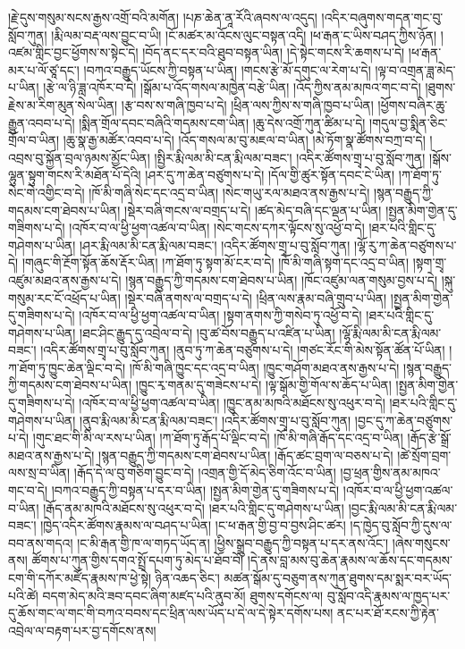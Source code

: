\documentclass{article}
\begin{document}
།རྗེ་དུས་གསུམ་སངས་རྒྱས་འགྲོ་བའི་མགོན། །པཎ་ཆེན་ནཱ་རོའི་ཞབས་ལ་འདུད། །འདིར་བཞུགས་གདན་གང་བུ་སློབ་ཀུན། །རྨི་ལམ་བརྡ་ལས་བྱུང་བ་ཡི། །ངོ་མཚར་མ་འོངས་ལུང་བསྟན་འདི། །ཕ་རྒན་ང་ཡིས་བཤད་ཀྱིས་ཉོན། །འཛམ་གླིང་བྱང་ཕྱོགས་ས་སྟེང་དེ། །བོད་ནང་དར་བའི་ཐུབ་བསྟན་ཡིན། །དེ་སྟེང་གངས་རི་ཆགས་པ་དེ། །ཕ་རྒན་མར་པ་ལོ་ཙཱ་དང་། །བཀའ་བརྒྱུད་ཡོངས་ཀྱི་བསྟན་པ་ཡིན། །གངས་རྩེ་མོ་དགུང་ལ་རེག་པ་དེ། །ལྟ་བ་འགྲན་ཟླ་མེད་པ་ཡིན། །རྩེ་ལ་ཉི་ཟླ་འཁོར་བ་དེ། །སྒོམ་པ་འོད་གསལ་མཁྱེན་བརྩེ་ཡིན། །འོད་ཀྱིས་ནམ་མཁའ་གང་བ་དེ། །ཐུགས་རྗེས་མ་རིག་མུན་སེལ་ཡིན། །རྩ་བས་ས་གཞི་ཁྱབ་པ་དེ། །ཕྲིན་ལས་ཀྱིས་ས་གཞི་ཁྱབ་པ་ཡིན། །ཕྱོགས་བཞིར་ཆུ་རྒྱུན་འབབ་པ་དེ། །སྨིན་གྲོལ་དབང་བཞིའི་གདམས་ངག་ཡིན། །ཆུ་དེས་འགྲོ་ཀུན་ཚིམ་པ་དེ། །གདུལ་བྱ་སྨིན་ཅིང་གྲོལ་བ་ཡིན། །ཆུ་སྣ་རྒྱ་མཚོར་འབབ་པ་དེ། །འོད་གསལ་མ་བུ་མཇལ་བ་ཡིན། །མེ་ཏོག་སྣ་ཚོགས་བཀྲ་བ་དེ། །འབྲས་བུ་སྐྱོན་བྲལ་ཉམས་མྱོང་ཡིན། །སྤྱིར་རྨི་ལམ་མི་ངན་རྨི་ལམ་བཟང་། །འདིར་ཚོགས་གྲྭ་པ་བུ་སློབ་ཀུན། །སྒོས་ལྷུན་སྟུག་གངས་རི་མཐོན་པོ་དེའི། །ཤར་དུ་ཀ་ཆེན་བཙུགས་པ་དེ། །དོལ་གྱི་ཚུར་སྟོན་དབང་ངེ་ཡིན། །ཀ་ཐོག་ཏུ་སེང་གེ་འགྱིང་བ་དེ། །ཁོ་མི་གཞི་སེང་དང་འདྲ་བ་ཡིན། །སེང་གཡུ་རལ་མཐའ་ནས་རྒྱས་པ་དེ། །སྙན་བརྒྱུད་ཀྱི་གདམས་ངག་ཐེབས་པ་ཡིན། །སྡེར་བཞི་གངས་ལ་བགྲད་པ་དེ། །ཚད་མེད་བཞི་དང་ལྡན་པ་ཡིན། །སྤྱན་མིག་གྱེན་དུ་གཟིགས་པ་དེ། །འཁོར་བ་ལ་ཕྱི་ཕྱག་འཚལ་བ་ཡིན། །སེང་གངས་དཀར་ལྟོངས་སུ་འཕྱོ་བ་དེ། །ཐར་པའི་གླིང་དུ་གཤེགས་པ་ཡིན། །ཤར་རྨི་ལམ་མི་ངན་རྨི་ལམ་བཟང་། །འདིར་ཚོགས་གྲྭ་པ་བུ་སློབ་ཀུན། །ལྷོ་རུ་ཀ་ཆེན་བཙུགས་པ་དེ། །གཞུང་གི་རྔོག་སྟོན་ཆོས་རྡོར་ཡིན། །ཀ་ཐོག་ཏུ་སྟག་མོ་ངར་བ་དེ། །ཁོ་མི་གཞི་སྟག་དང་འདྲ་བ་ཡིན། །སྟག་གྲྭ་འཛུམ་མཐའ་ནས་རྒྱས་པ་དེ། །སྙན་བརྒྱུད་ཀྱི་གདམས་ངག་ཐེབས་པ་ཡིན། །ཁོང་འཛུམ་ལན་གསུམ་བྱས་པ་དེ། །སྐུ་གསུམ་རང་ངོ་འཕྲོད་པ་ཡིན། །སྡེར་བཞི་ནགས་ལ་བགྲད་པ་དེ། །ཕྲིན་ལས་རྣམ་བཞི་གྲུབ་པ་ཡིན། །སྤྱན་མིག་གྱེན་དུ་གཟིགས་པ་དེ། །འཁོར་བ་ལ་ཕྱི་ཕྱག་འཚལ་བ་ཡིན། །སྟག་ནགས་ཀྱི་གསེབ་ཏུ་འཕྱོ་བ་དེ། །ཐར་པའི་གླིང་དུ་གཤེགས་པ་ཡིན། །ཐང་ཤིང་རྒྱུད་དུ་འབྲེལ་བ་དེ། །བུ་ཚ་བོས་བརྒྱུད་པ་འཛིན་པ་ཡིན། །ལྷོ་རྨི་ལམ་མི་ངན་རྨི་ལམ་བཟང་། །འདིར་ཚོགས་གྲྭ་པ་བུ་སློབ་ཀུན། །ནུབ་ཏུ་ཀ་ཆེན་བཙུགས་པ་དེ། །གཙང་རོང་གི་མེས་སྟོན་ཚོན་པོ་ཡིན། །ཀ་ཐོག་ཏུ་ཁྱུང་ཆེན་ལྡིང་བ་དེ། །ཁོ་མི་གཞི་ཁྱུང་དང་འདྲ་བ་ཡིན། །ཁྱུང་གཤོག་མཐའ་ནས་རྒྱས་པ་དེ། །སྙན་བརྒྱུད་ཀྱི་གདམས་ངག་ཐེབས་པ་ཡིན། །ཁྱུང་རྭ་གནམ་དུ་གཟེངས་པ་དེ། །ལྟ་སྒོམ་གྱི་གོལ་ས་ཆོད་པ་ཡིན། །སྤྱན་མིག་གྱེན་དུ་གཟིགས་པ་དེ། །འཁོར་བ་ལ་ཕྱི་ཕྱག་འཚལ་བ་ཡིན། །ཁྱུང་ནམ་མཁའི་མཐོངས་སུ་འཕུར་བ་དེ། །ཐར་པའི་གླིང་དུ་གཤེགས་པ་ཡིན། །ནུབ་རྨི་ལམ་མི་ངན་རྨི་ལམ་བཟང་། །འདིར་ཚོགས་གྲྭ་པ་བུ་སློབ་ཀུན། །བྱང་དུ་ཀ་ཆེན་བཙུགས་པ་དེ། །གུང་ཐང་གི་མི་ལ་རས་པ་ཡིན། །ཀ་ཐོག་ཏུ་རྒོད་པོ་ལྡིང་བ་དེ། །ཁོ་མི་གཞི་རྒོད་དང་འདྲ་བ་ཡིན། །རྒོད་རྩེ་སྒྲོ་མཐའ་ནས་རྒྱས་པ་དེ། །སྙན་བརྒྱུད་ཀྱི་གདམས་ངག་ཐེབས་པ་ཡིན། །རྒོད་ཚང་བྲག་ལ་བཅས་པ་དེ། །ཚེ་སྲོག་བྲག་ལས་སྲ་བ་ཡིན། །རྒོད་དེ་ལ་བུ་གཅིག་བྱུང་བ་དེ། །འགྲན་གྱི་དོ་མེད་ཅིག་འོང་བ་ཡིན། །བྱ་ཕྲན་གྱིས་ནམ་མཁའ་གང་བ་དེ། །བཀའ་བརྒྱུད་ཀྱི་བསྟན་པ་དར་བ་ཡིན། །སྤྱན་མིག་གྱེན་དུ་གཟིགས་པ་དེ། །འཁོར་བ་ལ་ཕྱི་ཕྱག་འཚལ་བ་ཡིན། །རྒོད་ནམ་མཁའི་མཐོངས་སུ་འཕུར་བ་དེ། །ཐར་པའི་གླིང་དུ་གཤེགས་པ་ཡིན། །བྱང་རྨི་ལམ་མི་ངན་རྨི་ལམ་བཟང་། །ཁྱེད་འདིར་ཚོགས་རྣམས་ལ་བཤད་པ་ཡིན། །ང་ཕ་རྒན་གྱི་བྱ་བ་བྱས་ཤིང་ཚར། །ད་ཁྱེད་བུ་སློབ་ཀྱི་དུས་ལ་བབ་ནས་གདའ། །ང་མི་རྒན་གྱི་ཁ་ལ་གཏད་ཡོད་ན། །ཕྱིས་སྒྲུབ་བརྒྱུད་ཀྱི་བསྟན་པ་དར་ནས་འོང་། །ཞེས་གསུངས་ནས། ཚོགས་པ་ཀུན་གྱིས་དགའ་སྤྲོ་དཔག་ཏུ་མེད་པ་ཐོབ་བོ། །དེ་ནས་བླ་མས་བུ་ཆེན་རྣམས་ལ་ཆོས་དང་གདམས་ངག་གི་དཀོར་མཛོད་རྣམས་ཁ་ཕྱེ་སྟེ། ཉིན་འཆད་ཅིང་། མཚན་སྒོམ་དུ་བཅུག་ནས་ཀུན་ཐུགས་དམ་སྨར་བར་ཡོད་པའི་ཚེ། བདག་མེད་མའི་ཟབ་དབང་ཞིག་མཛད་པའི་ནུབ་མོ། ཐུགས་དགོངས་ལ། བུ་སློབ་འདི་རྣམས་ལ་ཁྱད་པར་དུ་ཆོས་གང་ལ་གང་གི་བཀའ་བབས་དང་ཕྲིན་ལས་ཡོད་པ་དེ་ལ་དེ་སྟེར་དགོས་པས། ནང་པར་ཐོ་རངས་ཀྱི་རྟེན་འབྲེལ་ལ་བརྟག་པར་བྱ་དགོངས་ནས། 
\end{document}
